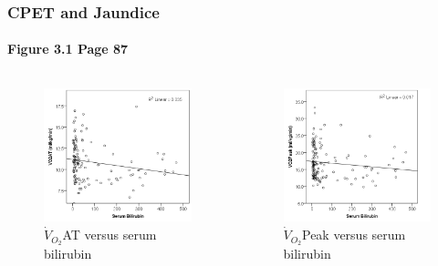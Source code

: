 \documentclass{beamer}
\begin{document}
\begin{frame}
	\frametitle{CPET and Jaundice}
	\framesubtitle{Figure 3.1 Page 87}
	\begin{columns}[t]
			\begin{figure}
				\centering
				\includegraphics[width=\textwidth]{../Figures/cpet_oj_scatter_at_bil}
				\caption{$\dot{V}_{O_2}$AT versus serum bilirubin}
				\label{fig:cpet_oj_scatter_at_bil}
			\end{figure}
			
			\begin{figure}
				\includegraphics[width=\textwidth]{../Figures/cpet_oj_scatter_peak_bil}
				\caption{$\dot{V}_{O_2}$Peak versus serum bilirubin}
				\label{fig:cpet_oj_scatter_peak_bil}
			\end{figure}
	\end{columns}
\end{frame}
\end{document}
